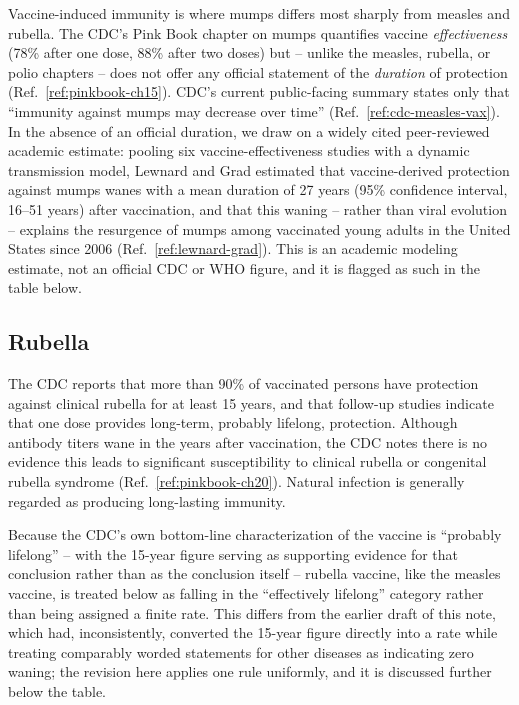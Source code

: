 \documentclass[11pt]{article}
\begin{document}
Vaccine-induced immunity is where mumps differs most sharply from measles
and rubella. The CDC's Pink Book chapter on mumps quantifies vaccine
\emph{effectiveness} (78\% after one dose, 88\% after two doses) but --
unlike the measles, rubella, or polio chapters -- does not offer any
official statement of the \emph{duration} of protection
(Ref.~\ref{ref:pinkbook-ch15}). CDC's current public-facing summary states
only that ``immunity against mumps may decrease over time''
(Ref.~\ref{ref:cdc-measles-vax}). In the absence of an official duration, we
draw on a widely cited peer-reviewed academic estimate: pooling six
vaccine-effectiveness studies with a dynamic transmission model, Lewnard and
Grad estimated that vaccine-derived protection against mumps wanes with a
mean duration of 27 years (95\% confidence interval, 16--51 years) after
vaccination, and that this waning -- rather than viral evolution -- explains
the resurgence of mumps among vaccinated young adults in the United States
since 2006 (Ref.~\ref{ref:lewnard-grad}). This is an academic modeling
estimate, not an official CDC or WHO figure, and it is flagged as such in
the table below.

\subsection{Rubella}

The CDC reports that more than 90\% of vaccinated persons have protection
against clinical rubella for at least 15 years, and that follow-up studies
indicate that one dose provides long-term, probably lifelong, protection.
Although antibody titers wane in the years after vaccination, the CDC notes
there is no evidence this leads to significant susceptibility to clinical
rubella or congenital rubella syndrome (Ref.~\ref{ref:pinkbook-ch20}).
Natural infection is generally regarded as producing long-lasting immunity.

Because the CDC's own bottom-line characterization of the vaccine is
``probably lifelong'' -- with the 15-year figure serving as supporting
evidence for that conclusion rather than as the conclusion itself -- rubella
vaccine, like the measles vaccine, is treated below as falling in the
``effectively lifelong'' category rather than being assigned a finite rate.
This differs from the earlier draft of this note, which had, inconsistently,
converted the 15-year figure directly into a rate while treating comparably
worded statements for other diseases as indicating zero waning; the revision
here applies one rule uniformly, and it is discussed further below the
table.
\end{document}
